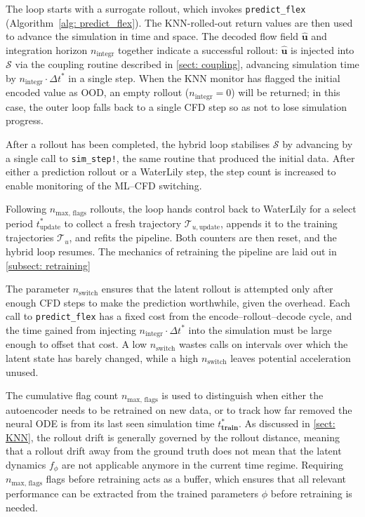 The loop starts with a surrogate rollout, which invokes \texttt{predict\_flex} (Algorithm~\ref{alg: predict_flex}). The KNN-rolled-out return values are then used to advance the simulation in time and space. The decoded flow field $\hat{\mathbf{u}}$ and integration horizon $n_\text{integr}$ together indicate a successful rollout: $\hat{\mathbf{u}}$ is injected into $\mathcal{S}$ via the coupling routine described in \autoref{sect: coupling}, advancing simulation time by $n_\text{integr} \cdot \Delta t^*$ in a single step. When the KNN monitor has flagged the initial encoded value as OOD, an empty rollout ($n_\text{integr} = 0$) will be returned; in this case, the outer loop falls back to a single CFD step so as not to lose simulation progress.

After a rollout has been completed, the hybrid loop stabilises $\mathcal{S}$ by advancing by a single call to \texttt{sim\_step!}, the same routine that produced the initial data. After either a prediction rollout or a WaterLily step, the step count is increased to enable monitoring of the ML--CFD switching. 

Following $n_\text{max, flags}$ rollouts, the loop hands control back to WaterLily for a select period $t^*_\text{update}$ to collect a fresh trajectory $\mathcal{T}_{u,\text{update}}$, appends it to the training trajectories $\boldsymbol{\mathcal{T}}_u$, and refits the pipeline. Both counters are then reset, and the hybrid loop resumes. The mechanics of retraining the pipeline are laid out in \autoref{subsect: retraining}

The parameter $n_\text{switch}$ ensures that the latent rollout is attempted only after enough CFD steps to make the prediction worthwhile, given the overhead. Each call to \texttt{predict\_flex} has a fixed cost from the encode--rollout--decode cycle, and the time gained from injecting $n_\text{integr} \cdot \Delta t^*$ into the simulation must be large enough to offset that cost. A low $n_\text{switch}$ wastes calls on intervals over which the latent state has barely changed, while a high $n_\text{switch}$ leaves potential acceleration unused.

The cumulative flag count $n_\text{max, flags}$ is used to distinguish when either the autoencoder needs to be retrained on new data, or to track how far removed the neural ODE is from its last seen simulation time $t^*_\textbf{train}$. As discussed in \autoref{sect: KNN}, the rollout drift is generally governed by the rollout distance, meaning that a rollout drift away from the ground truth does not mean that the latent dynamics $f_\phi$ are not applicable anymore in the current time regime. Requiring $n_\text{max, flags}$ flags before retraining acts as a buffer, which ensures that all relevant performance can be extracted from the trained parameters $\phi$ before retraining is needed. 


